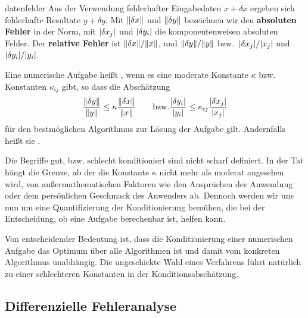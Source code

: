 \begin{Definition}{datenfehler}
  Aus der Verwendung fehlerhafter Eingabedaten $x+\delta x$ ergeben
  sich fehlerhafte Resultate $y+\delta y$. Mit $\lVert\delta x\rVert$ und
  $\lVert\delta y\rVert$ bezeichnen wir den \textbf{absoluten
    Fehler} in der Norm, mit $\lvert\delta x_j\rvert$
  und $\lvert\delta y_i\rvert$ die komponentenweisen absoluten Fehler. Der
  \textbf{relative Fehler} ist
  $\lVert\delta x\rVert/\lVert x\rVert$, und $\lVert\delta y\rVert/\lVert y\rVert$ bzw.\
  $\lvert\delta x_j\rvert/\lvert x_j\rvert$ und $\lvert\delta y_i\rvert/\lvert y_i\rvert$.

  Eine numerische Aufgabe heißt , wenn es
  eine moderate Konstante $\kappa$ bzw. Konstanten $\kappa_{ij}$ gibt, so dass die Abschätzung
  \begin{gather}
    \frac{\lVert\delta y\rVert}{\lVert y\rVert}
    \le \kappa \frac{\lVert\delta x\rVert}{\lVert x\rVert}
    \qquad\text{bzw.}
    \frac{\lvert\delta y_i\rvert}{\lvert y_i\rvert}
    \le \kappa_{ij} \frac{\lvert\delta x_j\rvert}{\lvert x_j\rvert}
  \end{gather}
  für den bestmöglichen Algorithmus zur Lösung der Aufgabe
  gilt. Andernfalls heißt sie .
\end{Definition}

\begin{remark}
  Die Begriffe \glqq gut\grqq, bzw. \glqq schlecht
  konditioniert\grqq{} sind nicht scharf definiert. In der Tat hängt
  die Grenze, ab der die Konstante $\kappa$ nicht mehr als \glqq
  moderat\grqq{} angesehen wird, von außermathematischen Faktoren wie
  den Ansprüchen der Anwendung oder dem persönlichen Geschmack des
  Anwenders ab. Dennoch werden wir uns nun um eine Quantifizierung der
  Konditionierung bemühen, die bei der Entscheidung, ob eine Aufgabe
  berechenbar ist, helfen kann.
\end{remark}

\begin{remark}
  Von entscheidender Bedeutung ist, dass die Konditionierung einer
  numerischen Aufgabe das Optimum über alle Algorithmen ist und damit
  vom konkreten Algorithmus unabhängig. Die ungeschickte Wahl eines
  Verfahrens führt natürlich zu einer schlechteren Konstanten in der
  Konditionsabschätzung.
\end{remark}

\subsection{Differenzielle Fehleranalyse}


